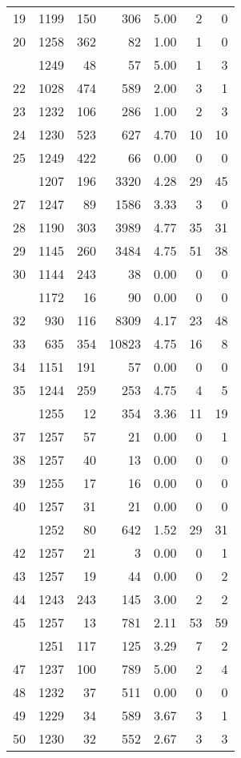 \documentclass[
]{article}
\begin{document}
\begin{table}
\begin{tabular}[t]{lrrrrrr}
19 & 1199 & 150 & 306 & 5.00 & 2 & 0\\
20 & 1258 & 362 & 82 & 1.00 & 1 & 0\\
\addlinespace
21 & 1249 & 48 & 57 & 5.00 & 1 & 3\\
22 & 1028 & 474 & 589 & 2.00 & 3 & 1\\
23 & 1232 & 106 & 286 & 1.00 & 2 & 3\\
24 & 1230 & 523 & 627 & 4.70 & 10 & 10\\
25 & 1249 & 422 & 66 & 0.00 & 0 & 0\\
\addlinespace
26 & 1207 & 196 & 3320 & 4.28 & 29 & 45\\
27 & 1247 & 89 & 1586 & 3.33 & 3 & 0\\
28 & 1190 & 303 & 3989 & 4.77 & 35 & 31\\
29 & 1145 & 260 & 3484 & 4.75 & 51 & 38\\
30 & 1144 & 243 & 38 & 0.00 & 0 & 0\\
\addlinespace
31 & 1172 & 16 & 90 & 0.00 & 0 & 0\\
32 & 930 & 116 & 8309 & 4.17 & 23 & 48\\
33 & 635 & 354 & 10823 & 4.75 & 16 & 8\\
34 & 1151 & 191 & 57 & 0.00 & 0 & 0\\
35 & 1244 & 259 & 253 & 4.75 & 4 & 5\\
\addlinespace
36 & 1255 & 12 & 354 & 3.36 & 11 & 19\\
37 & 1257 & 57 & 21 & 0.00 & 0 & 1\\
38 & 1257 & 40 & 13 & 0.00 & 0 & 0\\
39 & 1255 & 17 & 16 & 0.00 & 0 & 0\\
40 & 1257 & 31 & 21 & 0.00 & 0 & 0\\
\addlinespace
41 & 1252 & 80 & 642 & 1.52 & 29 & 31\\
42 & 1257 & 21 & 3 & 0.00 & 0 & 1\\
43 & 1257 & 19 & 44 & 0.00 & 0 & 2\\
44 & 1243 & 243 & 145 & 3.00 & 2 & 2\\
45 & 1257 & 13 & 781 & 2.11 & 53 & 59\\
\addlinespace
46 & 1251 & 117 & 125 & 3.29 & 7 & 2\\
47 & 1237 & 100 & 789 & 5.00 & 2 & 4\\
48 & 1232 & 37 & 511 & 0.00 & 0 & 0\\
49 & 1229 & 34 & 589 & 3.67 & 3 & 1\\
50 & 1230 & 32 & 552 & 2.67 & 3 & 3\\

\end{tabular}
\end{table}
\end{document}
